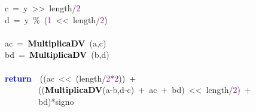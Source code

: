 \mbox{}\ \ \ \ \ \ \ \ c\ \textcolor{BrickRed}{=}\ y\ \textcolor{BrickRed}{\textgreater{}\textgreater{}}\ length\textcolor{BrickRed}{/}\textcolor{Purple}{2} \\
\mbox{}\ \ \ \ \ \ \ \ d\ \textcolor{BrickRed}{=}\ y\ \textcolor{BrickRed}{\%}\ \textcolor{BrickRed}{(}\textcolor{Purple}{1}\ \textcolor{BrickRed}{\textless{}\textless{}}\ length\textcolor{BrickRed}{/}\textcolor{Purple}{2}\textcolor{BrickRed}{)}\ \  \\
\mbox{} \\
\mbox{}\ \ \ \ \ \ \ \ ac\ \textcolor{BrickRed}{=}\ \textbf{\textcolor{Black}{MultiplicaDV}}\ \textcolor{BrickRed}{(}a\textcolor{BrickRed}{,}c\textcolor{BrickRed}{)} \\
\mbox{}\ \ \ \ \ \ \ \ bd\ \textcolor{BrickRed}{=}\ \textbf{\textcolor{Black}{MultiplicaDV}}\ \textcolor{BrickRed}{(}b\textcolor{BrickRed}{,}d\textcolor{BrickRed}{)} \\
\mbox{} \\
\mbox{}\ \ \ \ \ \ \ \ \textbf{\textcolor{Blue}{return}}\ \ \textcolor{BrickRed}{((}ac\ \textcolor{BrickRed}{\textless{}\textless{}}\ \textcolor{BrickRed}{(}length\textcolor{BrickRed}{/}\textcolor{Purple}{2}\textcolor{BrickRed}{*}\textcolor{Purple}{2}\textcolor{BrickRed}{))}\ \textcolor{BrickRed}{+}\  \\
\mbox{}\ \ \ \ \ \ \ \ \ \ \ \ \ \ \ \ \textcolor{BrickRed}{((}\textbf{\textcolor{Black}{MultiplicaDV}}\textcolor{BrickRed}{(}a\textcolor{BrickRed}{-}b\textcolor{BrickRed}{,}d\textcolor{BrickRed}{-}c\textcolor{BrickRed}{)}\ \textcolor{BrickRed}{+}\ ac\ \textcolor{BrickRed}{+}\ bd\textcolor{BrickRed}{)}\ \textcolor{BrickRed}{\textless{}\textless{}}\ length\textcolor{BrickRed}{/}\textcolor{Purple}{2}\textcolor{BrickRed}{)}\ \textcolor{BrickRed}{+} \\
\mbox{}\ \ \ \ \ \ \ \ \ \ \ \ \ \ \ \ bd\textcolor{BrickRed}{)*}signo \\
\mbox{}\ \ \ \  \\
\mbox{}